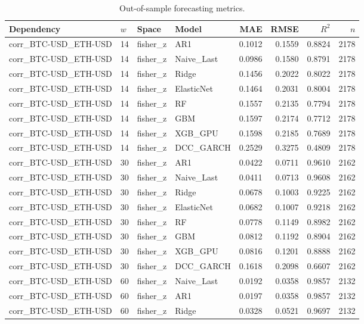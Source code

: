 \begin{table}[H]
\centering
\small
\caption{Out-of-sample forecasting metrics.}
\label{tab:metrics}
\begin{tabular}{llllrrrr}
\toprule
Dependency & $w$ & Space & Model & MAE & RMSE & $R^2$ & $n$ \\
\midrule
corr_BTC-USD_ETH-USD & 14 & fisher_z & AR1 & 0.1012 & 0.1559 & 0.8824 & 2178 \\
corr_BTC-USD_ETH-USD & 14 & fisher_z & Naive_Last & 0.0986 & 0.1580 & 0.8791 & 2178 \\
corr_BTC-USD_ETH-USD & 14 & fisher_z & Ridge & 0.1456 & 0.2022 & 0.8022 & 2178 \\
corr_BTC-USD_ETH-USD & 14 & fisher_z & ElasticNet & 0.1464 & 0.2031 & 0.8004 & 2178 \\
corr_BTC-USD_ETH-USD & 14 & fisher_z & RF & 0.1557 & 0.2135 & 0.7794 & 2178 \\
corr_BTC-USD_ETH-USD & 14 & fisher_z & GBM & 0.1597 & 0.2174 & 0.7712 & 2178 \\
corr_BTC-USD_ETH-USD & 14 & fisher_z & XGB_GPU & 0.1598 & 0.2185 & 0.7689 & 2178 \\
corr_BTC-USD_ETH-USD & 14 & fisher_z & DCC_GARCH & 0.2529 & 0.3275 & 0.4809 & 2178 \\
corr_BTC-USD_ETH-USD & 30 & fisher_z & AR1 & 0.0422 & 0.0711 & 0.9610 & 2162 \\
corr_BTC-USD_ETH-USD & 30 & fisher_z & Naive_Last & 0.0411 & 0.0713 & 0.9608 & 2162 \\
corr_BTC-USD_ETH-USD & 30 & fisher_z & Ridge & 0.0678 & 0.1003 & 0.9225 & 2162 \\
corr_BTC-USD_ETH-USD & 30 & fisher_z & ElasticNet & 0.0682 & 0.1007 & 0.9218 & 2162 \\
corr_BTC-USD_ETH-USD & 30 & fisher_z & RF & 0.0778 & 0.1149 & 0.8982 & 2162 \\
corr_BTC-USD_ETH-USD & 30 & fisher_z & GBM & 0.0812 & 0.1192 & 0.8904 & 2162 \\
corr_BTC-USD_ETH-USD & 30 & fisher_z & XGB_GPU & 0.0816 & 0.1201 & 0.8888 & 2162 \\
corr_BTC-USD_ETH-USD & 30 & fisher_z & DCC_GARCH & 0.1618 & 0.2098 & 0.6607 & 2162 \\
corr_BTC-USD_ETH-USD & 60 & fisher_z & Naive_Last & 0.0192 & 0.0358 & 0.9857 & 2132 \\
corr_BTC-USD_ETH-USD & 60 & fisher_z & AR1 & 0.0197 & 0.0358 & 0.9857 & 2132 \\
corr_BTC-USD_ETH-USD & 60 & fisher_z & Ridge & 0.0328 & 0.0521 & 0.9697 & 2132 \\

\end{tabular}
\end{table}

